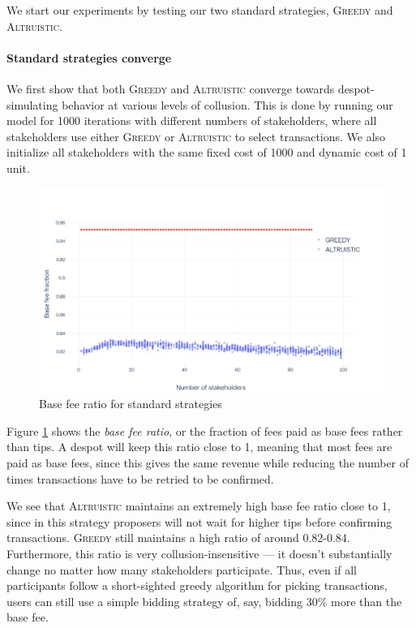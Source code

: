 \documentclass[letterpaper,12pt,oneside]{article}
\begin{document}
We start our experiments by testing our two standard strategies, \textsc{Greedy} and \textsc{Altruistic}.

\paragraph*{Standard strategies converge} We first show that both \textsc{Greedy} and \textsc{Altruistic} converge towards despot-simulating behavior at various levels of collusion. This is done by running our model for 1000 iterations with different numbers of stakeholders, where all stakeholders use either \textsc{Greedy} or \textsc{Altruistic} to select transactions. We also initialize all stakeholders with the same fixed cost of 1000 and dynamic cost of 1 unit.

\begin{figure}[!h]
    \centering
    \includegraphics[width=0.8\linewidth]{standard-convergence.png}
    \caption{Base fee ratio for standard strategies}
    \label{standard-convergence}
\end{figure}

Figure \ref{standard-convergence} shows the \emph{base fee ratio}, or the fraction of fees paid as base fees rather than tips. A despot will keep this ratio close to 1, meaning that most fees are paid as base fees, since this gives the same revenue while reducing the number of times transactions have to be retried to be confirmed.

We see that \textsc{Altruistic} maintains an extremely high base fee ratio close to 1, since in this strategy proposers will not wait for higher tips before confirming transactions. \textsc{Greedy} still maintains a high ratio of around 0.82-0.84. Furthermore, this ratio is very collusion-insensitive --- it doesn't substantially change no matter how many stakeholders participate. Thus, even if all participants follow a short-sighted greedy algorithm for picking transactions, users can still use a simple bidding strategy of, say, bidding 30\% more than the base fee.
\end{document}
